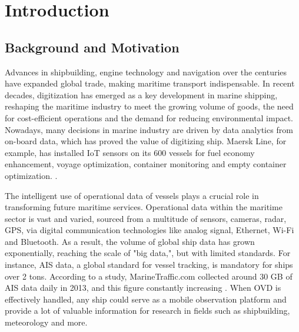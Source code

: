 \chapter{Introduction}\label{chap:Intro}



\section{Background and Motivation}

Advances in shipbuilding, engine technology and navigation over the centuries have expanded global trade, making maritime transport indispensable. 
In recent decades, digitization has emerged as a key development in marine shipping, reshaping the maritime industry to meet the growing volume of goods, the need for cost-efficient operations and the demand for reducing environmental impact.
Nowadays, many decisions in marine industry are driven by data analytics from on-board data, which has proved the value of digitizing ship.
Maersk Line, for example, has installed IoT sensors on its 600 vessels for fuel economy enhancement, voyage optimization, container monitoring and empty container optimization. \cite{raza_digital_2023}. 

The intelligent use of operational data of vessels plays a crucial role in transforming future maritime services.
Operational data within the maritime sector is vast and varied, sourced from a multitude of
sensors, cameras, radar, GPS, via digital communication technologies like analog signal, Ethernet, Wi-Fi and Bluetooth.
As a result, the volume of global ship data has grown exponentially, reaching the scale of "big data,", but with limited standards.
For instance, AIS data, a global standard for vessel tracking, is mandatory for ships over 2 tons.
According to a study, MarineTraffic.com collected around 30 GB of AIS data daily in 2013, and this figure constantly increasing \cite{webdigitship}. 
When OVD is effectively handled, any ship could serve as a mobile observation platform and provide a lot of valuable information for research in fields such as shipbuilding, meteorology and more.  


